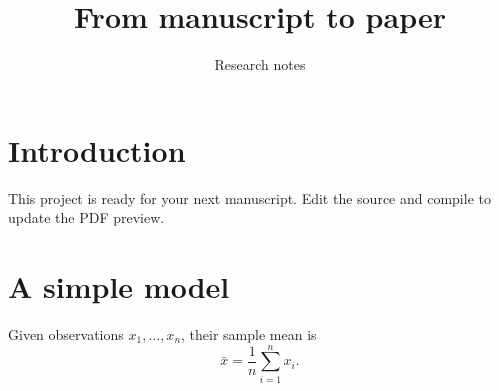 \documentclass[11pt]{article}
\title{From manuscript to paper}
\author{Research notes}
\date{}
\begin{document}
\maketitle

\section{Introduction}
This project is ready for your next manuscript.
Edit the source and compile to update the PDF preview.

\section{A simple model}
Given observations $x_1,\ldots,x_n$, their sample mean is
\begin{equation}
  \bar{x} = \frac{1}{n}\sum_{i=1}^{n} x_i .
\end{equation}
\end{document}
